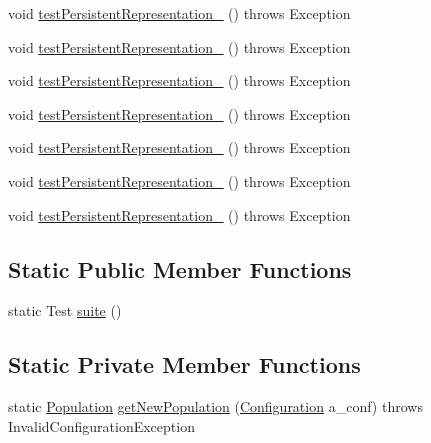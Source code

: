 \begin{DoxyCompactItemize}
\item 
void \hyperlink{classorg_1_1jgap_1_1_population_test_af75ae49a85829d08746c4fa29e481155}{test\-Persistent\-Representation\-\_} ()  throws Exception 
\item 
void \hyperlink{classorg_1_1jgap_1_1_population_test_aa21fabd2a6cb94ecdc961d1b7d604f8e}{test\-Persistent\-Representation\-\_} ()  throws Exception 
\item 
void \hyperlink{classorg_1_1jgap_1_1_population_test_a16de347ebdf129f7b33c0ec27d992b20}{test\-Persistent\-Representation\-\_} ()  throws Exception 
\item 
void \hyperlink{classorg_1_1jgap_1_1_population_test_ab0d1292fbd988ff1312f2d9b9aa82899}{test\-Persistent\-Representation\-\_} ()  throws Exception 
\item 
void \hyperlink{classorg_1_1jgap_1_1_population_test_ab29392049b639749a5727a4afcb91240}{test\-Persistent\-Representation\-\_} ()  throws Exception 
\item 
void \hyperlink{classorg_1_1jgap_1_1_population_test_a69523bb61141d52d8cf7ddcf2e1b7bcc}{test\-Persistent\-Representation\-\_} ()  throws Exception 
\item 
void \hyperlink{classorg_1_1jgap_1_1_population_test_a457be67fcad438bc7e408a8f45591052}{test\-Persistent\-Representation\-\_} ()  throws Exception 
\end{DoxyCompactItemize}
\subsection*{Static Public Member Functions}
\begin{DoxyCompactItemize}
\item 
static Test \hyperlink{classorg_1_1jgap_1_1_population_test_a9b8c3d813df8ed5cb48ade38d3af4f17}{suite} ()
\end{DoxyCompactItemize}
\subsection*{Static Private Member Functions}
\begin{DoxyCompactItemize}
\item 
static \hyperlink{classorg_1_1jgap_1_1_population}{Population} \hyperlink{classorg_1_1jgap_1_1_population_test_a22f25495d58d741c067c4fe3a2ac75ef}{get\-New\-Population} (\hyperlink{classorg_1_1jgap_1_1_configuration}{Configuration} a\-\_\-conf)  throws Invalid\-Configuration\-Exception 
\end{DoxyCompactItemize}

